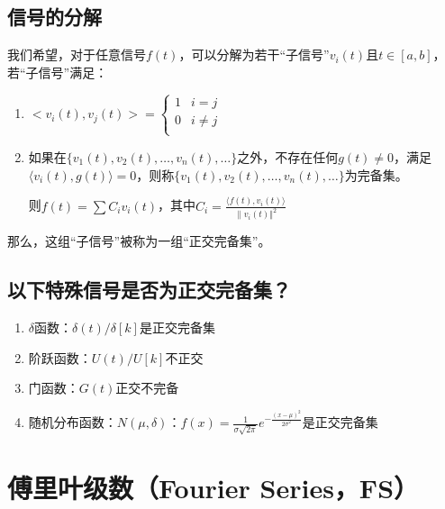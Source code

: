 \documentclass[UTF8]{ctexart}
\begin{document}
\subsection{信号的分解}
我们希望，对于任意信号$f(t)$，可以分解为若干“子信号”$v_i(t)$且$t\in[a,b]$，若“子信号”满足：\par
\begin{enumerate}[label=(\arabic*),itemindent=0pt,labelindent=\parindent,labelwidth=2em,labelsep=5pt,leftmargin=*]
    \item $<v_i(t),v_j(t)>=\left\{
          \begin{array}{cl}
          1 &  i=j \\
          0 &  i\neq{j} \\
          \end{array} \right.$\par
    \item 如果在$\{v_1(t),v_2(t),\ldots,v_n(t),\ldots\}$之外，不存在任何$g(t)\neq0$，满足$\langle{v_i(t),g(t)}\rangle=0$，则称$\{v_1(t),v_2(t),\ldots,v_n(t),\ldots\}$为完备集。\par
          则$f(t)=\sum{C_iv_i(t)}$，其中$C_i=\frac{\langle{f(t),v_i(t)}\rangle}{\|v_i(t)\Vert^2}  $\par
\end{enumerate}\par
那么，这组“子信号”被称为一组“正交完备集”。\par

\subsection{以下特殊信号是否为正交完备集？}
\begin{enumerate}[label=(\arabic*),itemindent=0pt,labelindent=\parindent,labelwidth=2em,labelsep=5pt,leftmargin=*]
    \item $\delta$函数：$\delta(t)/\delta[k]$是正交完备集\par
    \item 阶跃函数：$U(t)/U[k]$不正交\par
    \item 门函数：$G(t)$正交不完备\par
    \item 随机分布函数：$N(\mu,\delta)$：$f(x)=\frac{1}{\sigma\sqrt{2\pi}}e^{-\frac{(x-\mu)^2}{2\sigma^2}}$是正交完备集\par
\end{enumerate}

\section{傅里叶级数（Fourier Series，FS）}
\end{document}
